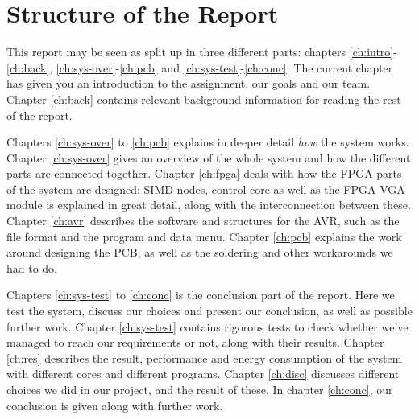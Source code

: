 \section{Structure of the Report}

This report may be seen as split up in three different parts: chapters
\ref{ch:intro}-\ref{ch:back}, \ref{ch:sys-over}-\ref{ch:pcb} and
\ref{ch:sys-test}-\ref{ch:conc}.  The
current chapter has given you an introduction to the assignment, our goals and
our team. Chapter \ref{ch:back} contains relevant background information for
reading the rest of the report.

Chapters \ref{ch:sys-over} to \ref{ch:pcb} explains in deeper detail {\em how}
the system works. Chapter \ref{ch:sys-over} gives an
overview of the whole system and how the different parts are connected
together. Chapter \ref{ch:fpga} deals with how the FPGA parts of the system are
designed: SIMD-nodes, control core as well as the FPGA VGA module is explained
in great detail, along with the interconnection between these. Chapter
\ref{ch:avr} describes the software and structures for the AVR, such as the file
format and the program and data menu. Chapter \ref{ch:pcb} explains the work
around designing the PCB, as well as the soldering and other workarounds we had
to do.

Chapters \ref{ch:sys-test} to \ref{ch:conc} is the conclusion part of the
report. Here we test the system, discuss our choices and present our conclusion,
as well as possible further work. Chapter \ref{ch:sys-test} contains rigorous
tests to check whether we've managed to reach our requirements or not, along
with their results. Chapter \ref{ch:res} describes the result, performance and
energy consumption of the system with different cores and different
programs. Chapter \ref{ch:disc} discusses different choices we did in our
project, and the result of these. In chapter \ref{ch:conc}, our conclusion is
given along with further work.

